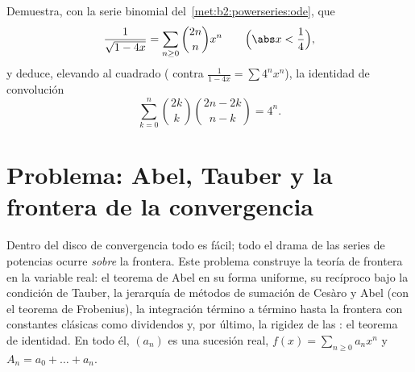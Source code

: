 \begin{exercise}[$\star\star\star$]\label{exo:b2:powerseries:12}
Demuestra, con la serie binomial del~\cref{met:b2:powerseries:ode}, que
\[
\frac{1}{\sqrt{1 - 4x}} = \sum_{n\geq0}\binom{2n}{n}x^n
\qquad \Bigl(\abs x < \frac14\Bigr),
\]
y deduce, elevando al cuadrado ( contra
$\frac{1}{1-4x} = \sum 4^nx^n$), la identidad de convolución
\[
\sum_{k=0}^{n}\binom{2k}{k}\binom{2n-2k}{n-k} = 4^n .
\]
\end{exercise}

\section{Problema: Abel, Tauber y la frontera de la convergencia}

\begin{problem}\label{pb:b2:powerseries:1}
Dentro del disco de convergencia todo es fácil; todo el drama de las
series de potencias ocurre \emph{sobre} la frontera. Este problema
construye la teoría de frontera en la variable real: el teorema de
Abel en su forma uniforme, su recíproco bajo la condición de Tauber,
la jerarquía de métodos de sumación de Cesàro y Abel (con el teorema
de Frobenius), la integración término a término hasta la frontera
con constantes clásicas como dividendos y, por último, la rigidez de
las : el teorema de
identidad. En todo
él, $(a_n)$ es una sucesión real, $f(x) = \sum_{n\geq0} a_nx^n$ y
$A_n = a_0 + \dots + a_n$.


\end{problem}
